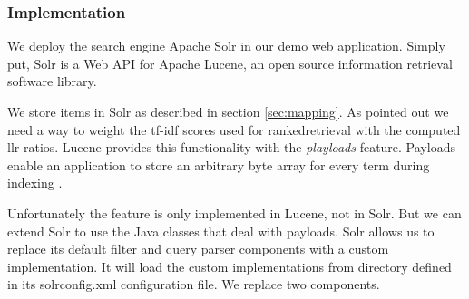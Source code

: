 \subsubsection{Implementation}
\label{sec:solrimpl}
We deploy the search engine Apache Solr in our demo web application. Simply put, Solr is a Web API for Apache Lucene, an open source information retrieval software library. 

We store items in Solr as described in section \ref{sec:mapping}. As pointed out we need a way to weight the tf-idf scores used for \gls{rankedretrieval} with the computed \gls{llr} ratios. Lucene provides this functionality with the \emph{playloads} feature. Payloads enable an application to store an arbitrary byte array for every term during indexing \cite{McCandless}.

Unfortunately the feature is only implemented in Lucene, not in Solr. But we can extend Solr to use the Java classes that deal with payloads. Solr allows us to replace its default filter and query parser components with a custom implementation. It will load the custom implementations from directory defined in its solrconfig.xml configuration file. We replace two components.
